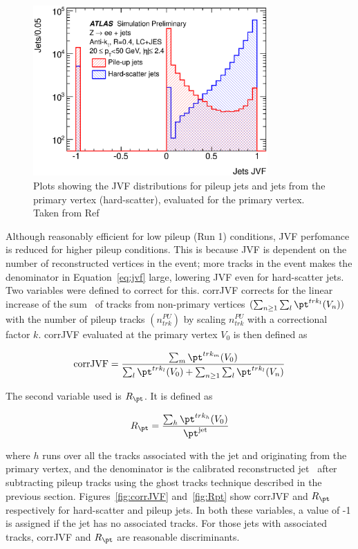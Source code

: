 \begin{figure}[!h]
\centering
   \includegraphics[width=0.8\textwidth]{figures/c_jets_JVF_PUTJ_Simulation_log.eps}
\caption{Plots showing the JVF distributions for pileup jets and jets from the primary vertex (hard-scatter), evaluated 
for the primary vertex. Taken from Ref~\cite{Aad:2015ina}}
	\label{fig:jvfPl}
\end{figure}

\par Although reasonably efficient for low pileup (Run 1) conditions, JVF perfomance is reduced 
for higher pileup conditions. This is because JVF is dependent on the number of reconstructed 
vertices in the event; more tracks in the event makes the denominator in Equation~\ref{eq:jvf} 
large, lowering JVF even for hard-scatter jets. Two variables were defined to correct for this.  
corrJVF corrects for the linear increase of the sum \pt\ of tracks from non-primary vertices
$(\sum_{n\geq 1}\sum_l\pt^{trk_l}(V_n))$ with the number of pileup tracks $(n_{trk}^{PU})$ by scaling 
$n_{trk}^{PU}$ with a correctional factor $k$. corrJVF evaluated at the primary vertex $V_0$ is 
then defined as 

\begin{equation}
\text{corrJVF} = \frac{\sum_m \pt^{trk_m}(V_0)}{\sum_l \pt^{trk_l}(V_0) + \sum_{n\geq 1}\sum_l\pt^{trk_l}(V_n)}
\end{equation}

The second variable used is $R_{\pt}$. It is defined as 

\begin{equation}
R_{\pt} = \frac{\sum_h \pt^{trk_h}(V_0)}{\pt^{\text{jet}}}
\end{equation}

where $h$ runs over all the tracks associated with the jet and originating from the primary vertex, and the denominator 
is the calibrated reconstructed jet \pt\ after subtracting pileup tracks using the ghost tracks technique 
described in the previous section. Figures~\ref{fig:corrJVF} and~\ref{fig:Rpt} show corrJVF and $R_{\pt}$ 
respectively for hard-scatter and pileup jets. In both these variables, a value of -1 is assigned if the 
jet has no associated tracks. For those jets with associated tracks, corrJVF and $R_{\pt}$ are reasonable 
discriminants. 

